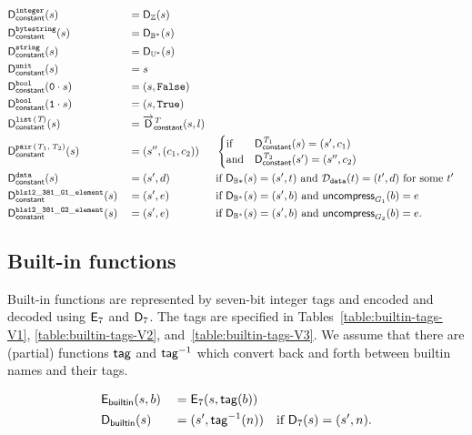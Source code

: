\begin{alignat*}{3}
  &\mathsf{D}_{\mathsf{constant}}^{\mathtt{integer}}(s)              &&= \mathsf{D}_{\mathbb{Z}}(s) \\
  &\mathsf{D}_{\mathsf{constant}}^{\mathtt{bytestring}}(s)           &&= \mathsf{D}_{\mathbb{B}^*}(s) \\
  &\mathsf{D}_{\mathsf{constant}}^{\mathtt{string}}(s)               &&= \mathsf{D}_{\mathbb{U}^*}(s) \\
  &\mathsf{D}_{\mathsf{constant}}^{\mathtt{unit}}(s)                 &&= s  \\
  &\mathsf{D}_{\mathsf{constant}}^{\mathtt{bool}}(\mathtt{0} \cdot s)  &&= (s, \texttt{False}) \\
  &\mathsf{D}_{\mathsf{constant}}^{\mathtt{bool}}(\mathtt{1} \cdot s)  &&= (s, \texttt{True}) \\
  &\mathsf{D}_{\mathsf{constant}}^{\mathtt{list}\,\mathtt{(}\textit{T}\mathtt{)}}(s)              &&= \overrightarrow{\mathsf{D}}^{\textit{T}}_{\mathsf{constant}}(s, l) \\
  &\mathsf{D}_{\mathsf{constant}}^{\mathtt{pair}\,\mathtt{(}\textit{T}_1\mathtt{,}\,\textit{T}_2\mathtt{)}}(s)     &&= (s'', (c_1, c_2)) 
  && \begin{cases}
       \text{if}  & \mathsf{D}_{\mathsf{constant}}^{\textit{T}_1}(s) = (s', c_1) \\
       \text{and} & \mathsf{D}_{\mathsf{constant}}^{\textit{T}_2}(s') = (s'', c_2)
     \end{cases}\\
  &\mathsf{D}_{\mathsf{constant}}^{\mathtt{data}}(s)                  &&= (s', d) &&
                                           \text{if $\mathsf{D}_{\mathbb{B}*}(s) = (s', t)$
                                            and $\mathcal{D}_{\mathtt{data}}(t) = (t', d)$ for some $t'$}\\
  & \mathsf{D}_{\mathsf{constant}}^{\mathtt{bls12\_381\_G1\_element}}(s)  &&= (s',e) && \text{if $\mathsf{D}_{\mathbb{B}^*}(s) = (s',b)$ and $\mathsf{uncompress}_{G_1}(b)=e$}\\
  & \mathsf{D}_{\mathsf{constant}}^{\mathtt{bls12\_381\_G2\_element}}(s)  &&= (s',e) && \text{if $\mathsf{D}_{\mathbb{B}^*}(s) = (s',b)$ and $\mathsf{uncompress}_{G_2}(b)=e$}.
\end{alignat*}

\subsection{Built-in functions}
Built-in functions are represented by seven-bit integer tags and encoded and
decoded using $\mathsf{E}_7$ and $\mathsf{D}_7$.  The tags are specified in
Tables~\ref{table:builtin-tags-V1}, \ref{table:builtin-tags-V2}, and~\ref{table:builtin-tags-V3}.  We
assume that there are (partial) functions $\mathsf{tag}$ and $\mathsf{tag}^{-1}$ which convert back
and forth between builtin names and their tags.

\begin{alignat*}{2}
  & \mathsf{E}_{\mathsf{builtin}}(s,b) &&= \mathsf{E}_7(s, \mathsf{tag}(b))\\
  & \mathsf{D}_{\mathsf{builtin}}(s)   &&= (s', \mathsf{tag}^{-1}(n)) \quad \text{if $\mathsf{D}_7(s) = (s', n)$}.\\
\end{alignat*}


